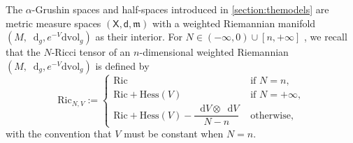 \documentclass[11pt,twoside,a4paper]{article}
\newcommand*\diff{\mathop{}\!\mathrm{d}}
\newcommand{\vol}{\mathrm{dvol}}
\newcommand{\Ric}{\mathrm{Ric}}
\newcommand{\X}{\mathsf{X}}
\newcommand{\di}
{\mathsf d} %
\newcommand{\hes}{\mathrm{Hess}}
\theoremstyle{theorem}
\theoremstyle{definition}
\theoremstyle{remark}
\theoremstyle{proof}
\begin{document}
The $\alpha$-Grushin spaces and half-spaces introduced in \cref{section:themodels} are metric measure spaces $(\X, \di, \mathfrak{m})$ with a weighted Riemannian manifold $(M, \diff_g, e^{-V}\vol_g)$ as their interior. For $N \in (-\infty,0)\cup[n,+\infty]$
, we recall that the $N$-Ricci tensor of an $n$-dimensional weighted Riemannian $(M, \diff_g, e^{-V} \vol_g)$ is defined by
\begin{equation}
    \label{eq:NRicci}
    \Ric_{N,V}:= \begin{cases}
        \Ric & \text{ if } N=n, \\
        \Ric + \hes(V) & \text{ if } N=+\infty,\\
        \Ric+\hes(V)-\dfrac{\diff V\otimes\diff V}{N-n} & \text{ otherwise},
    \end{cases}
\end{equation}
with the convention that $V$ must be constant when $N=n$.
\end{document}
